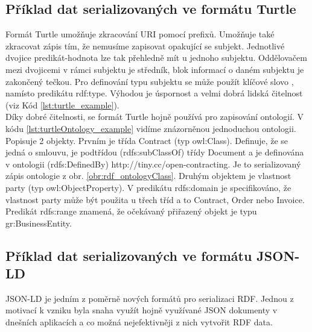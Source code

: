 

\subsection{Příklad dat serializovaných ve formátu Turtle}

Formát Turtle umožňuje zkracování URI pomocí prefixů. Umožňuje také zkracovat zápis tím, že nemusíme zapisovat opakující se subjekt. Jednotlivé dvojice predikát-hodnota lze tak přehledně mít u jednoho subjektu. Oddělovačem mezi dvojicemi v rámci subjektu je středník, blok informací o daném subjektu je zakončený tečkou. Pro definování typu subjektu se může použít klíčové slovo , namísto predikátu rdf:type. Výhodou je úspornost a velmi dobrá lidská čitelnost (viz Kód \ref{lst:turtle_example}).\\



Díky dobré čitelnosti, se formát Turtle hojně používá pro zapisování ontologií. V kódu \ref{lst:turtleOntology_example} vidíme znázorněnou jednoduchou ontologii. Popisuje 2 objekty. Prvním je třída Contract (typ owl:Class). Definuje, že se jedná o smlouvu, je podtřídou (rdfs:subClassOf) třídy Document a je definována v ontologii (rdfs:DefinedBy) http://tiny.cc/open-contracting. Je to serializovaný zápis ontologie z obr. \ref{obr:rdf_ontologyClass}. Druhým objektem je vlastnost party (typ owl:ObjectProperty). V predikátu rdfs:domain je specifikováno, že vlastnost party může být použita u třech tříd a to Contract, Order nebo Invoice. Predikát rdfs:range znamená, že očekávaný přiřazený objekt je typu gr:BusinessEntity.\\



\subsection{Příklad dat serializovaných ve formátu JSON-LD}

JSON-LD je jedním z poměrně nových formátů pro serializaci RDF. Jednou z motivací k vzniku byla snaha využít hojně využívané JSON dokumenty v dnešních aplikacích a co možná nejefektivněji z nich vytvořit RDF data.

